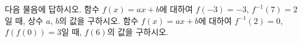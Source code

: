 다음 물음에 답하시오.
 함수 $f(x)=ax+b$에 대하여 $f(-3)=-3$, $f^{-1}(7)=2$일 때, 상수 $a$, $b$의 값을 구하시오.
 함수 $f(x)=ax+b$에 대하여 $f^{-1}(2)=0$, $f(f(0))=3$일 때, $f(6)$의 값을 구하시오. 

